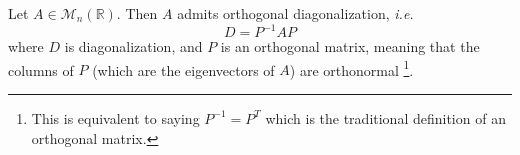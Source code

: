 \begin{thm}\label{thm-orthogonal-diagonalization}
	Let $A\in\mathcal{M}_n(\mathbb{R})$. Then $A$ admits orthogonal diagonalization,
	\textit{i.e.}
	\begin{equation}
		D = P^{-1}AP
	\end{equation}
	where $D$ is diagonalization, and $P$ is an orthogonal matrix, meaning that
	the columns of $P$ (which are the eigenvectors of $A$) are orthonormal
	\footnote{This is equivalent to saying $P^{-1}=P^T$ which is the traditional
		definition of an orthogonal matrix.}.
\end{thm}
